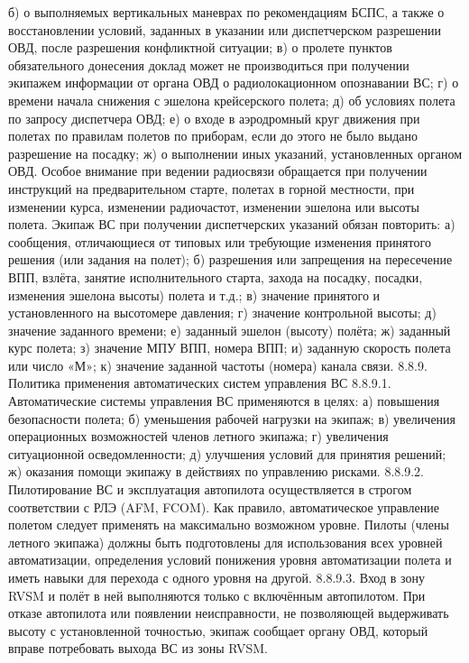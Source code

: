 б)	о выполняемых вертикальных маневрах по рекомендациям БСПС, а также о восстановлении условий, заданных в указании или диспетчерском разрешении ОВД, после разрешения конфликтной ситуации;
в)	о пролете пунктов обязательного донесения доклад может не производиться при получении экипажем информации от органа ОВД о радиолокационном опознавании ВС;
г)	о времени начала снижения с эшелона крейсерского полета;
д)	об условиях полета по запросу диспетчера ОВД;
е)	о входе в аэродромный круг движения при полетах по правилам полетов по приборам, если до этого не было выдано разрешение на посадку;
ж)	о выполнении иных указаний, установленных органом ОВД.
Особое внимание при ведении радиосвязи обращается при получении инструкций на предварительном старте, полетах в горной местности, при изменении курса, изменении радиочастот, изменении эшелона или высоты полета.
Экипаж ВС при получении диспетчерских указаний обязан повторить:
а)	сообщения, отличающиеся от типовых или требующие изменения принятого решения (или задания на полет);
б)	разрешения или запрещения на пересечение ВПП, взлёта, занятие исполнительного старта, захода на посадку, посадки, изменения эшелона высоты) полета и т.д.;
в)	значение принятого и установленного на высотомере давления;
г)	значение контрольной высоты;
д)	значение заданного времени;
е)	заданный эшелон (высоту) полёта;
ж)	заданный курс полета;
з)	значение МПУ ВПП, номера ВПП;
и)	заданную скорость полета или число «М»;
к)	значение заданной частоты (номера) канала связи.
8.8.9. Политика применения автоматических систем управления ВС
8.8.9.1. Автоматические системы управления ВС применяются в целях: 
а) повышения безопасности полета; 
б) уменьшения рабочей нагрузки на экипаж; 
в) увеличения операционных возможностей членов летного экипажа; 
г) увеличения ситуационной осведомленности; 
д) улучшения условий для принятия решений; 
ж) оказания помощи экипажу в действиях по управлению рисками. 
8.8.9.2. Пилотирование ВС и эксплуатация автопилота осуществляется в строгом соответствии с РЛЭ (AFM, FCOM).
Как правило, автоматическое управление полетом следует применять на максимально возможном уровне. 
Пилоты (члены летного экипажа) должны быть подготовлены для использования всех уровней автоматизации, определения условий понижения уровня автоматизации полета и иметь навыки для перехода с одного уровня на другой. 
8.8.9.3. Вход в зону RVSM и полёт в ней выполняются только с включённым автопилотом. При отказе автопилота или появлении неисправности, не позволяющей выдерживать высоту с установленной точностью, экипаж сообщает органу ОВД, который вправе потребовать выхода ВС из зоны RVSM.	
